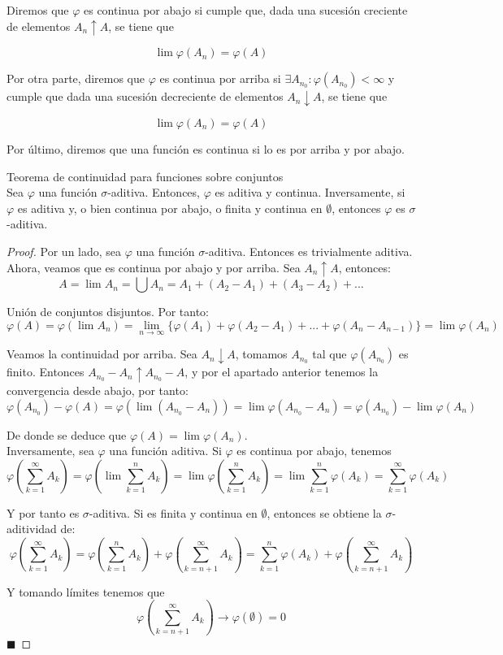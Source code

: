 \documentclass[12pt,a4paper]{book}
\newcommand*{\qed}{\hfill\ensuremath{\blacksquare}}
\begin{document}
Diremos que $\varphi$ es continua por abajo si cumple que, dada una sucesión creciente de elementos $A_n \uparrow A$, se tiene que

$$ \lim \varphi (A_n) = \varphi (A) $$

Por otra parte, diremos que $\varphi$ es continua por arriba si $\exists A_{n_0} : \varphi (A_{n_0}) < \infty$ y cumple que dada una sucesión decreciente de elementos $A_n \downarrow A$, se tiene que

$$ \lim \varphi (A_n) = \varphi (A)$$

Por último, diremos que una función es continua si lo es por arriba y por abajo.

\begin{theorem}
Teorema de continuidad para funciones sobre conjuntos\\

Sea $\varphi$ una función $\sigma$-aditiva. Entonces, $\varphi$ es aditiva y continua. Inversamente, si $\varphi$ es aditiva y, o bien continua por abajo, o finita y continua en $\emptyset$, entonces $\varphi$ es $\sigma$-aditiva.
\end{theorem}

\begin{proof}
Por un lado, sea $\varphi$ una función $\sigma$-aditiva. Entonces es trivialmente aditiva. Ahora, veamos que es continua por abajo y por arriba. Sea $A_n \uparrow A$, entonces:
$$ A = \lim A_n = \bigcup A_n = A_1 + (A_2 - A_1) + (A_3 - A_2) +... $$

Unión de conjuntos disjuntos. Por tanto:
$$ \varphi (A) = \varphi (\lim A_n) = \lim_{n \to \infty } \{ \varphi (A_1) + \varphi (A_2 - A_1) + ... + \varphi (A_n - A_{n-1}) \} = \lim \varphi (A_n) $$

Veamos la continuidad por arriba. Sea $A_n \downarrow A$, tomamos $A_{n_0}$ tal que $\varphi (A_{n_0})$ es finito. Entonces $A_{n_0} - A_n \uparrow A_{n_0} - A$, y por el apartado anterior tenemos la convergencia desde abajo, por tanto:
$$ \varphi (A_{n_0}) - \varphi (A) = \varphi (\lim (A_{n_0} - A_n)) = \lim \varphi (A_{n_0} - A_n) = \varphi (A_{n_0}) - \lim \varphi (A_n) $$

De donde se deduce que $ \varphi (A) = \lim \varphi (A_n) $.\\

Inversamente, sea $ \varphi$ una función aditiva. Si $\varphi$ es continua por abajo, tenemos
$$ \varphi \left( \sum_{k=1}^{\infty} A_k \right) = \varphi \left( \lim \sum_{k=1}^n A_k \right) = \lim \varphi \left( \sum_{k=1}^n A_k \right) = \lim \sum_{k=1}^n \varphi \left( A_k \right) = \sum_{k=1}^{\infty} \varphi (A_k) $$

Y por tanto es $\sigma$-aditiva. Si es finita y continua en $\emptyset$, entonces se obtiene la $\sigma$-aditividad de:
$$ \varphi \left( \sum_{k=1}^{\infty} A_k \right) = \varphi \left( \sum_{k=1}^{n} A_k \right) + \varphi \left( \sum_{k=n+1}^{\infty} A_k \right) = \sum_{k=1}^{n} \varphi (A_k) + \varphi \left( \sum_{k=n+1}^{\infty} A_k \right) $$

Y tomando límites tenemos que
$$ \varphi \left( \sum_{k=n+1}^{\infty} A_k \right) \to \varphi (\emptyset) = 0 $$
\qed
\end{proof}
\end{document}
